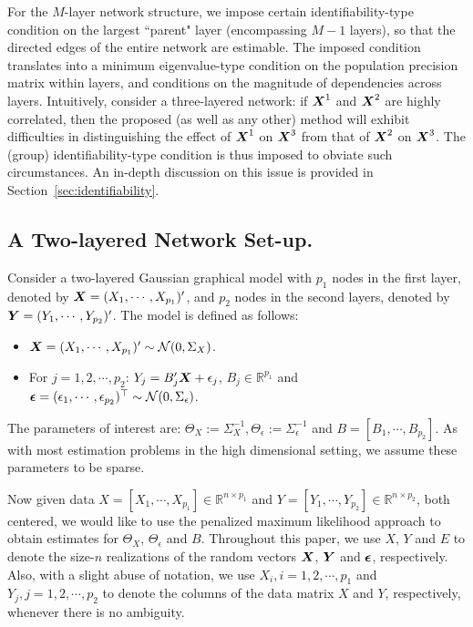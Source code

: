 \noindent
\begin{remark}
For the $M$-layer network structure, we impose certain identifiability-type condition on the largest ``parent" layer (encompassing $M-1$ layers), so that the directed edges of the entire network are estimable. The imposed condition translates into a minimum eigenvalue-type condition on the population precision matrix within layers, and conditions on the magnitude of dependencies across layers. Intuitively, consider a three-layered network: if $\boldsymbol{X}^1$ and $\boldsymbol{X}^2$ are highly correlated, then the proposed (as well as any other) method will exhibit difficulties in distinguishing the effect of $\boldsymbol{X}^1$ on $\boldsymbol{X}^3$ from that of $\boldsymbol{X}^2$ on $\boldsymbol{X}^3$. The (group) identifiability-type condition is thus imposed to obviate such circumstances. An in-depth discussion on this issue is provided in Section~\ref{sec:identifiability}.
\end{remark}

\subsection{\normalsize A Two-layered Network Set-up.}\label{sec:set-up}

Consider a two-layered Gaussian graphical model with $p_1$ nodes in the first layer, denoted by $\boldsymbol{X}=(X_1,\cdots,X_{p_1})'$, and $p_2$ nodes in the second layers, denoted by $\boldsymbol{Y}=(Y_1,\cdots,Y_{p_2})'$. The model is defined as follows: 
\begin{itemize}
\setlength\itemsep{1pt}
\renewcommand\labelitemi{--}
\item $\boldsymbol{X}=(X_1,\cdots,X_{p_1})'\sim \mathcal{N}(0,\Sigma_X)$.
\item For $j=1,2,\cdots,p_2$: $Y_j = B_j' \boldsymbol{X} + \epsilon_j$, $B_j\in\mathbb{R}^{p_1}$ and $\boldsymbol{\epsilon}=(\epsilon_1,\cdots,\epsilon_{p_2})^\top\sim\mathcal{N}(0,\Sigma_\epsilon)$.
\end{itemize}
The parameters of interest are: $\Theta_X:=\Sigma_X^{-1},\Theta_\epsilon:=\Sigma_\epsilon^{-1}$ and $B=[B_1,\cdots,B_{p_2}]$. As with most estimation problems in the high dimensional setting, we assume these parameters to be sparse. 

Now given data $X=[X_1,\cdots,X_{p_1}]\in\mathbb{R}^{n\times p_1}$ and $Y=[Y_1,\cdots,Y_{p_2}]\in\mathbb{R}^{n\times p_2}$, both centered, we would like to use the penalized maximum likelihood approach to obtain estimates for $\Theta_X$, $\Theta_\epsilon$ and $B$. Throughout this paper, we use $X$, $Y$ and $E$ to denote the size-$n$ realizations of the random vectors $\boldsymbol{X}$, $\boldsymbol{Y}$ and $\boldsymbol{\epsilon}$, respectively. Also, with a slight abuse of notation, we use $X_i,i=1,2,\cdots,p_1$ and $Y_{j},j=1,2,\cdots,p_2$ to denote the columns of the data matrix $X$ and $Y$, respectively, whenever there is no ambiguity. \\

